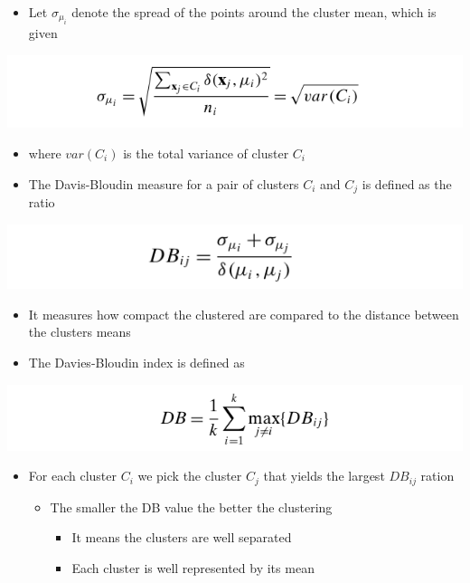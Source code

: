 \documentclass[11pt]{article}
\begin{document}
\begin{itemize}
\item Let \(\sigma_{\mu_i}\) denote the spread of the points around the cluster mean, which is given
\end{itemize}
\begin{center}
\includegraphics[width=.9\linewidth]{Clustering Validation/screenshot_2018-11-25_09-28-28.png}
\end{center} 
\begin{itemize}
\item where \(var(C_i)\) is the total variance of cluster \(C_i\)

\item The Davis-Bloudin measure for a pair of clusters \(C_i\) and \(C_j\) is defined as the ratio
\end{itemize}
\begin{center}
\includegraphics[width=.9\linewidth]{Clustering Validation/screenshot_2018-11-25_09-30-04.png}
\end{center}
\begin{itemize}
\item It measures how compact the clustered are compared to the distance between the clusters means

\item The Davies-Bloudin index is defined as
\end{itemize}
\begin{center}
\includegraphics[width=.9\linewidth]{Clustering Validation/screenshot_2018-11-25_09-50-46.png}
\end{center}
\begin{itemize}
\item For each cluster \(C_i\) we pick the cluster \(C_j\) that yields the largest \(DB_{ij}\) ration
\begin{itemize}
\item The smaller the DB value the better the clustering
\begin{itemize}
\item It means the clusters are well separated
\item Each cluster is well represented by its mean
\end{itemize}
\end{itemize}
\end{itemize}
\end{document}

